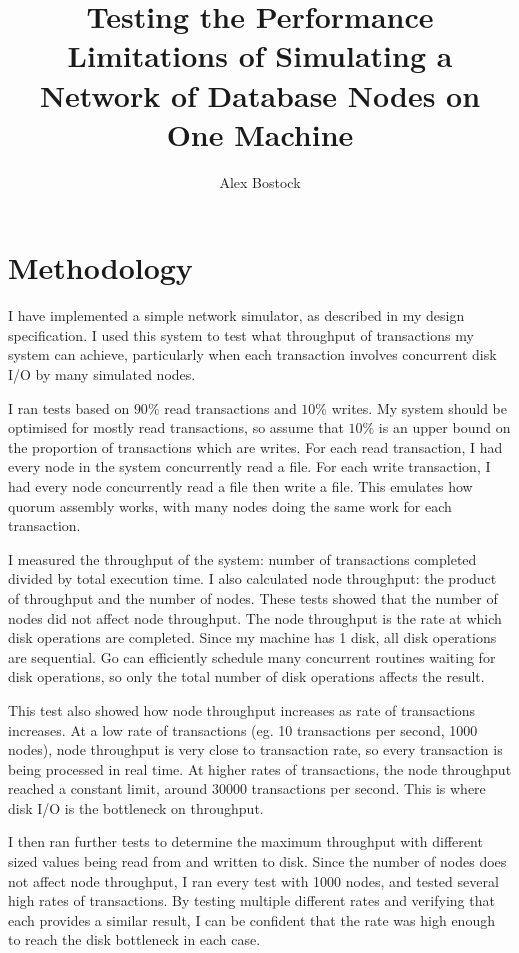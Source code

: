 \documentclass[12pt,a4paper]{article}
\title{Testing the Performance Limitations of Simulating a Network of Database Nodes on One Machine}
\author{Alex Bostock}
\date{}
\begin{document}
\maketitle
\thispagestyle{fancy}

\section*{Methodology}

I have implemented a simple network simulator, as described in my design specification. I used this system to test what throughput of transactions my system can achieve, particularly when each transaction involves concurrent disk I/O by many simulated nodes.

I ran tests based on $90\%$ read transactions and $10\%$ writes. My system should be optimised for mostly read transactions, so assume that $10\%$ is an upper bound on the proportion of transactions which are writes. For each read transaction, I had every node in the system concurrently read a file. For each write transaction, I had every node concurrently read a file then write a file. This emulates how quorum assembly works, with many nodes doing the same work for each transaction. 

I measured the throughput of the system: number of transactions completed divided by total execution time. I also calculated node throughput: the product of throughput and the number of nodes. These tests showed that the number of nodes did not affect node throughput. The node throughput is the rate at which disk operations are completed. Since my machine has 1 disk, all disk operations are sequential. Go can efficiently schedule many concurrent routines waiting for disk operations, so only the total number of disk operations affects the result.

This test also showed how node throughput increases as rate of transactions increases. At a low rate of transactions (eg. 10 transactions per second, 1000 nodes), node throughput is very close to transaction rate, so every transaction is being processed in real time. At higher rates of transactions, the node throughput reached a constant limit, around 30000 transactions per second. This is where disk I/O is the bottleneck on throughput.

I then ran further tests to determine the maximum throughput with different sized values being read from and written to disk. Since the number of nodes does not affect node throughput, I ran every test with 1000 nodes, and tested several high rates of transactions. By testing multiple different rates and verifying that each provides a similar result, I can be confident that the rate was high enough to reach the disk bottleneck in each case.
\end{document}
